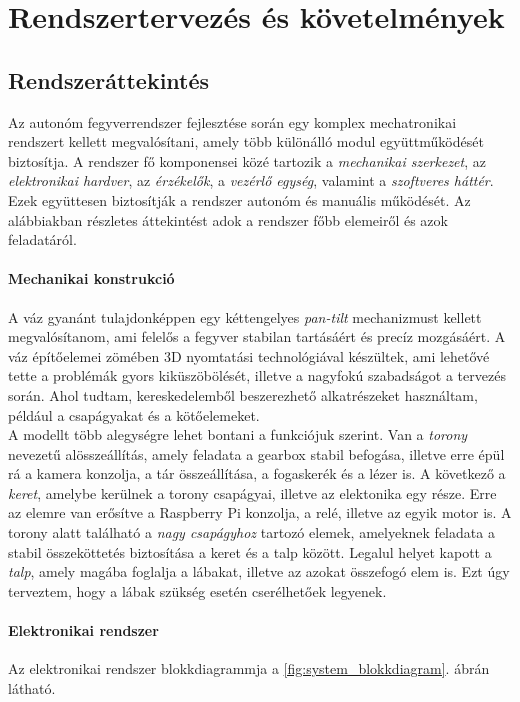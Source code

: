 \chapter{Rendszertervezés és követelmények}

\section{Rendszeráttekintés}
Az autonóm fegyverrendszer fejlesztése során egy komplex mechatronikai rendszert kellett megvalósítani, amely több különálló modul együttműködését biztosítja. A rendszer fő komponensei közé tartozik a \textsl{mechanikai szerkezet}, az \textsl{elektronikai hardver}, az \textsl{érzékelők}, a \textsl{vezérlő egység}, valamint a \textsl{szoftveres háttér}. Ezek együttesen biztosítják a rendszer autonóm és manuális működését. Az alábbiakban részletes áttekintést adok a rendszer főbb elemeiről és azok feladatáról.

\subsubsection*{Mechanikai konstrukció}

A váz gyanánt tulajdonképpen egy kéttengelyes \textsl{pan-tilt} mechanizmust kellett megvalósítanom, ami felelős a fegyver stabilan tartásáért és precíz mozgásáért. A váz építőelemei zömében 3D nyomtatási technológiával készültek, ami lehetővé tette a problémák gyors kiküszöbölését, illetve a nagyfokú szabadságot a tervezés során. Ahol tudtam, kereskedelemből beszerezhető alkatrészeket használtam, például a csapágyakat és a kötőelemeket.\\

A modellt több alegységre lehet bontani a funkciójuk szerint. Van a \textsl{torony} nevezetű alösszeállítás, amely feladata a gearbox stabil befogása, illetve erre épül rá a kamera konzolja, a tár összeállítása, a fogaskerék és a lézer is. A következő a \textsl{keret}, amelybe kerülnek a torony csapágyai, illetve az elektonika egy része. Erre az elemre van erősítve a Raspberry Pi konzolja, a relé, illetve az egyik motor is. A torony alatt található a \textsl{nagy csapágyhoz }tartozó elemek, amelyeknek feladata a stabil összeköttetés biztosítása a keret és a talp között. Legalul helyet kapott a \textsl{talp}, amely magába foglalja a lábakat, illetve az azokat összefogó elem is. Ezt úgy terveztem, hogy a lábak szükség esetén cserélhetőek legyenek.

\pagebreak
\subsubsection*{Elektronikai rendszer}
Az elektronikai rendszer blokkdiagrammja a \ref{fig:system_blokkdiagram}. ábrán látható.\\

